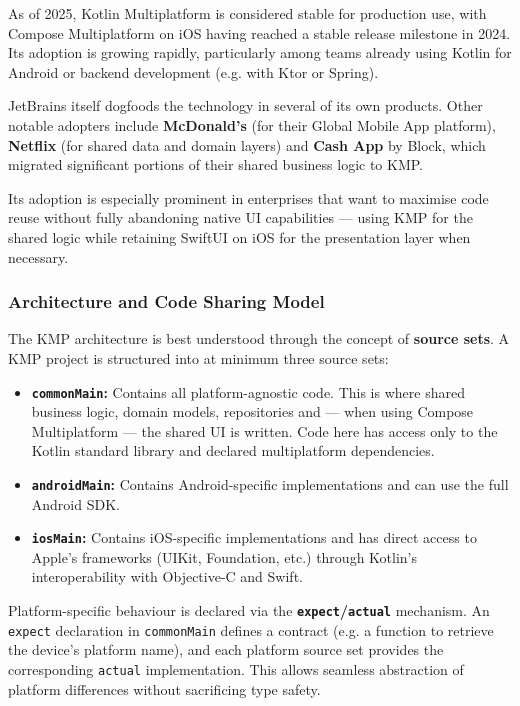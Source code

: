     As of 2025, Kotlin Multiplatform is considered stable for production use, with Compose Multiplatform on iOS having reached a stable release milestone in 2024. Its adoption is growing rapidly, particularly among teams already using Kotlin for Android or backend development (e.g. with Ktor or Spring).

    JetBrains itself dogfoods the technology in several of its own products. Other notable adopters include \textbf{McDonald's} (for their Global Mobile App platform), \textbf{Netflix} (for shared data and domain layers) and \textbf{Cash App} by Block, which migrated significant portions of their shared business logic to KMP. \cite{KMP:02}

    Its adoption is especially prominent in enterprises that want to maximise code reuse without fully abandoning native UI capabilities --- using KMP for the shared logic while retaining SwiftUI on iOS for the presentation layer when necessary.

    \subsubsection{Architecture and Code Sharing Model}

    The KMP architecture is best understood through the concept of \textbf{source sets}. A KMP project is structured into at minimum three source sets:

    \begin{itemize}
        \item \textbf{\texttt{commonMain}:} Contains all platform-agnostic code. This is where shared business logic, domain models, repositories and --- when using Compose Multiplatform --- the shared UI is written. Code here has access only to the Kotlin standard library and declared multiplatform dependencies.
        \item \textbf{\texttt{androidMain}:} Contains Android-specific implementations and can use the full Android SDK.
        \item \textbf{\texttt{iosMain}:} Contains iOS-specific implementations and has direct access to Apple's frameworks (UIKit, Foundation, etc.) through Kotlin's interoperability with Objective-C and Swift.
    \end{itemize}

    Platform-specific behaviour is declared via the \textbf{\texttt{expect}/\texttt{actual}} mechanism. An \texttt{expect} declaration in \texttt{commonMain} defines a contract (e.g. a function to retrieve the device's platform name), and each platform source set provides the corresponding \texttt{actual} implementation. This allows seamless abstraction of platform differences without sacrificing type safety. \cite{KMP:03}

